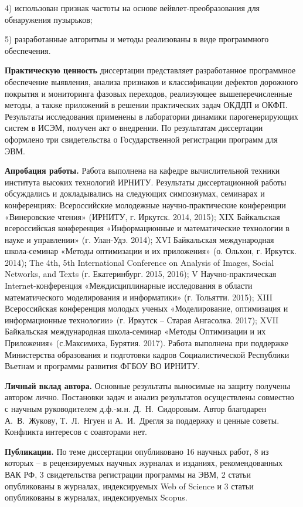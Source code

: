 4) использован признак частоты на основе вейвлет-преобразования для обнаружения пузырьков;

5) разработанные алгоритмы и методы реализованы в виде программного обеспечения.


\textbf{Практическую ценность} диссертации представляет разработанное программное обеспечение выявления, анализа признаков и классификации дефектов дорожного покрытия и мониторинга фазовых переходов, реализующее вышеперечисленные методы, а также приложений в решении практических задач ОКДДП и ОКФП. Результаты исследования применены в лаборатории динамики парогенерирующих систем в ИСЭМ, получен акт о внедрении. По результатам диссертации оформлено три свидетельства о Государственной регистрации программ для ЭВМ.

\textbf{Апробация работы.} Работа выполнена на кафедре вычислительной техники института высоких технологий ИРНИТУ. Результаты диссертационной работы обсуждались и докладывались на следующих симпозиумах, семинарах и конференциях: Всероссийские молодежные научно-практические конференции «Винеровские чтения» (ИРНИТУ, г. Иркутск. 2014, 2015); XIX Байкальская всероссийская конференция «Информационные и математические технологии в науке и управлении» (г. Улан-Удэ. 2014); XVI Байкальская международная школа-семинар «Методы оптимизации и их приложения» (о. Ольхон, г. Иркутск. 2014); The 4th, 5th International Conference on Analysis of Images, Social Networks, and Texts (г. Екатеринбург. 2015, 2016); V Научно-практическая Internet-конференция «Междисциплинарные исследования в области математического моделирования и информатики» (г. Тольятти. 2015); XIII Всероссийская конференция молодых ученых «Моделирование, оптимизация и информационные технологии» (г. Иркутск – Старая Ангасолка. 2017); XVII Байкальская международная школа-семинар «Методы Оптимизации и их Приложения» (с.Максимиха, Бурятия. 2017). Работа выполнена при поддержке Министерства образования и подготовки кадров Социалистической Республики Вьетнам и программы развития ФГБОУ ВО ИРНИТУ.

\textbf{Личный вклад автора.} Основные результаты выносимые на защиту получены автором лично. Постановки задач и анализ результатов осуществлены совместно с научным руководителем д.ф.-м.н. Д.~Н.~Сидоровым. Автор благодарен А.~В.~Жукову, Т.~Л.~Нгуен и А.~И.~Дрегля за поддержку и ценные советы. Конфликта интересов с соавторами нет.

\textbf{Публикации.} По теме диссертации опубликовано 16 научных работ, 8 из которых -- в рецензируемых научных журналах и изданиях, рекомендованных ВАК РФ, 3 свидетельства регистрации программы на ЭВМ, 2 статьи опубликованы в журналах, индексируемых Web of Science и 3 статьи опубликованы в журналах, индексируемых Scopus.

